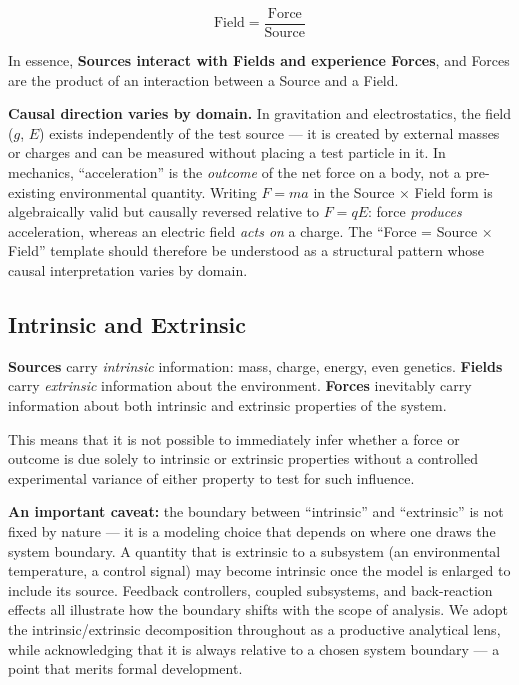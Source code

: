 \documentclass[
  letterpaper,
  DIV=11,
  numbers=noendperiod]{scrartcl}
\begin{document}
\[\text{Field} = \frac{\text{Force}}{\text{Source}}\]

In essence, \textbf{Sources interact with Fields and experience Forces},
and Forces are the product of an interaction between a Source and a
Field.

\begin{tcolorbox}[enhanced jigsaw, title=\textcolor{quarto-callout-note-color}{\faInfo}\hspace{0.5em}{Note}, breakable, left=2mm, opacitybacktitle=0.6, rightrule=.15mm, opacityback=0, toptitle=1mm, bottomrule=.15mm, arc=.35mm, leftrule=.75mm, colbacktitle=quarto-callout-note-color!10!white, toprule=.15mm, colframe=quarto-callout-note-color-frame, bottomtitle=1mm, titlerule=0mm, colback=white, coltitle=black]

\textbf{Causal direction varies by domain.} In gravitation and
electrostatics, the field (\(g\), \(E\)) exists independently of the
test source --- it is created by external masses or charges and can be
measured without placing a test particle in it. In mechanics,
``acceleration'' is the \emph{outcome} of the net force on a body, not a
pre-existing environmental quantity. Writing \(F = ma\) in the Source ×
Field form is algebraically valid but causally reversed relative to
\(F = qE\): force \emph{produces} acceleration, whereas an electric
field \emph{acts on} a charge. The ``Force = Source × Field'' template
should therefore be understood as a structural pattern whose causal
interpretation varies by domain.

\end{tcolorbox}

\subsection{Intrinsic and Extrinsic}\label{intrinsic-and-extrinsic}

\textbf{Sources} carry \emph{intrinsic} information: mass, charge,
energy, even genetics. \textbf{Fields} carry \emph{extrinsic}
information about the environment. \textbf{Forces} inevitably carry
information about both intrinsic and extrinsic properties of the system.

This means that it is not possible to immediately infer whether a force
or outcome is due solely to intrinsic or extrinsic properties without a
controlled experimental variance of either property to test for such
influence.

\textbf{An important caveat:} the boundary between ``intrinsic'' and
``extrinsic'' is not fixed by nature --- it is a modeling choice that
depends on where one draws the system boundary. A quantity that is
extrinsic to a subsystem (an environmental temperature, a control
signal) may become intrinsic once the model is enlarged to include its
source. Feedback controllers, coupled subsystems, and back-reaction
effects all illustrate how the boundary shifts with the scope of
analysis. We adopt the intrinsic/extrinsic decomposition throughout as a
productive analytical lens, while acknowledging that it is always
relative to a chosen system boundary --- a point that merits formal
development.
\end{document}
